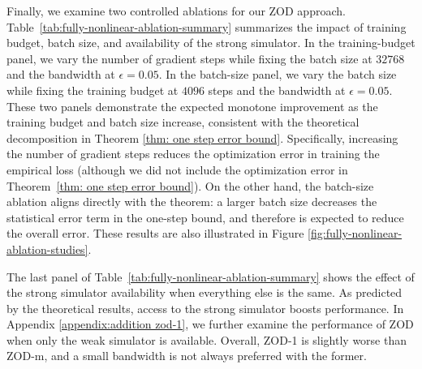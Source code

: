 \documentclass[twoside,11pt]{article}
\newcommand{\1}{\mathbf{1}}
\numberwithin{equation}{section}
\begin{document}
Finally, we examine two controlled ablations for our ZOD approach.
Table~\ref{tab:fully-nonlinear-ablation-summary} summarizes the impact of
training budget, batch size, and availability of the strong simulator.  In the training-budget panel, we vary the number of gradient
steps while fixing the batch size at $32768$ and  the bandwidth at
$\epsilon=0.05$.  In the batch-size panel, we
vary the batch size while fixing the training budget at $4096$ steps and the
bandwidth at $\epsilon=0.05$.  These two
panels demonstrate the expected monotone improvement as the training
budget and batch size increase,  consistent with the theoretical decomposition in Theorem \ref{thm: one step error bound}. Specifically, increasing the number of gradient steps reduces the optimization error in training the empirical loss (although we did not include the optimization error in Theorem~\ref{thm: one step error bound}). On the other hand, the batch-size ablation aligns directly with the theorem: a larger batch size decreases the statistical error term in the one-step bound, and therefore is expected to reduce the overall error. These results are also illustrated in Figure \ref{fig:fully-nonlinear-ablation-studies}.

The last panel of Table~\ref{tab:fully-nonlinear-ablation-summary} shows the effect of the strong simulator availability when everything else is the same. As predicted by the theoretical results, access to the strong simulator boosts performance.  In Appendix \ref{appendix:addition zod-1}, we further examine the performance of ZOD when only the weak simulator is available. Overall, ZOD-1 is slightly worse than ZOD-m, and  a small bandwidth is not always preferred with the former.
\end{document}
